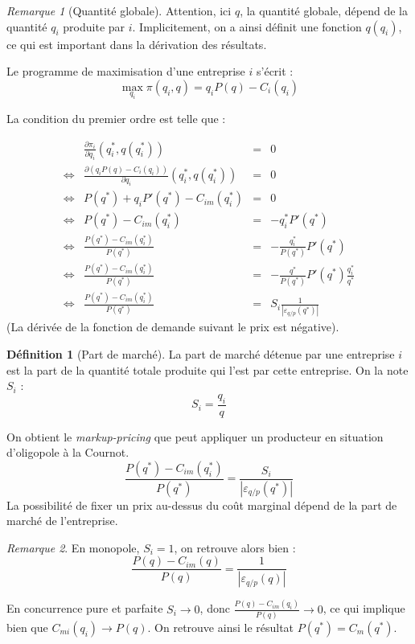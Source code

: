 \documentclass[
  a4paper,
]{book}
\theoremstyle{definition}
\newtheorem{definition}{Définition}[chapter]
\theoremstyle{definition}
\theoremstyle{definition}
\theoremstyle{definition}
\theoremstyle{remark}
\newtheorem*{remark}{Remarque}
\begin{document}
\begin{remark}[Quantité globale]
Attention, ici \(q\), la quantité globale, dépend de la quantité \(q_i\) produite par \(i\).
Implicitement, on a ainsi définit une fonction \(q(q_i)\), ce qui est important dans la dérivation des résultats.
\end{remark}

Le programme de maximisation d'une entreprise \(i\) s'écrit :
\[
\max_{q_i}\pi(q_i, q) = q_iP(q) -C_i(q_i)
\]

La condition du premier ordre est telle que :

\[
\begin{array}{crcl}
&\frac{\partial \pi_i}{\partial q_i}(q_i^*, q(q_i^*)) &=& 0\\
\Leftrightarrow & \frac{\partial  \left(q_iP(q) -C_i(q_i)\right)}{\partial q_i}(q_i^*, q(q_i^*)) &= &0\\
\Leftrightarrow & P(q^*) + q_iP'(q^*) -C_{im}(q_i^*)&= &0\\
\Leftrightarrow & P(q^*) - C_{im}(q_i^*)&= &-q_i^*P'(q^*) \\
\Leftrightarrow & \frac{P(q^*)-C_{im}(q_i^*)}{P(q^*)}&= &-\frac{q_i^*}{P(q^*)}P'(q^*) \\
\Leftrightarrow & \frac{P(q^*) -C_{im}(q_i^*)}{P(q^*)}&= &-\frac{q^*}{P(q^*)}P'(q^*)\frac{q_i^*}{q^*} \\
\Leftrightarrow & \frac{P(q^*) - C_{im}(q_i^*)}{P(q^*)}&= &S_i\frac{1}{\left|\varepsilon_{q/p}(q^*)\right|}
\end{array}
\]
(La dérivée de la fonction de demande suivant le prix est négative).

\begin{definition}[Part de marché]
La part de marché détenue par une entreprise \(i\) est la part de la quantité totale produite qui l'est par cette entreprise.
On la note \(S_i\) :
\[S_i=\frac{q_i}{q}\]
\end{definition}

On obtient le \emph{markup-pricing} que peut appliquer un producteur en situation d'oligopole à la Cournot.
\[\frac{P(q^*) -C_{im}(q_i^*)}{P(q^*)}= \frac{S_i}{\left|\varepsilon_{q/p}(q^*)\right|}\]
La possibilité de fixer un prix au-dessus du coût marginal dépend de la part de marché de l'entreprise.

\begin{remark}
En monopole, \(S_i=1\), on retrouve alors bien :
\[\frac{P(q) -C_{im}(q)}{P(q)}= \frac{1}{\left|\varepsilon_{q/p}(q)\right|}\]

En concurrence pure et parfaite \(S_i\to 0\), donc \(\frac{P(q) -C_{im}(q_i)}{P(q)}\to 0\), ce qui implique bien que \(C_{mi}(q_i)\to P(q)\).
On retrouve ainsi le résultat \(P(q^*)=C_m(q^*)\).
\end{remark}
\end{document}
